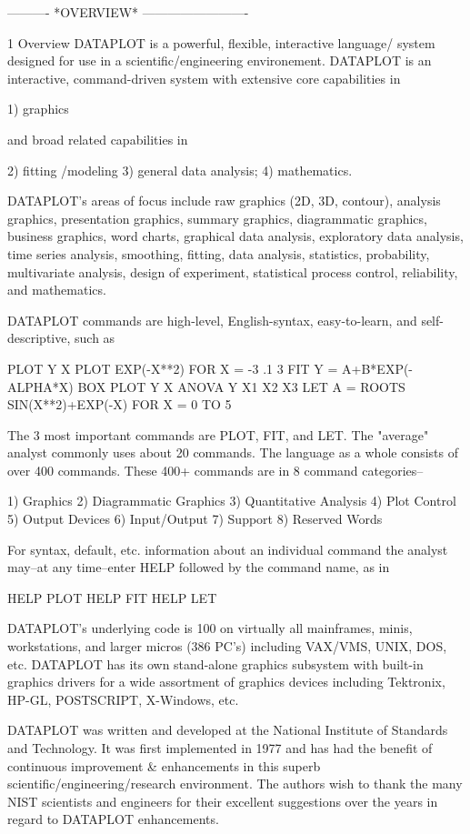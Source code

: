 ----------  *OVERVIEW*  -------------------------
 
1
Overview
DATAPLOT is a powerful, flexible, interactive language/
system designed for use in a scientific/engineering
environement.  DATAPLOT is an interactive, command-driven
system with extensive core capabilities in
 
      1) graphics
 
and broad related capabilities in
 
      2) fitting /modeling
      3) general data analysis;
      4) mathematics.
 
DATAPLOT's areas of focus include raw graphics (2D,
3D, contour), analysis graphics, presentation graphics,
summary graphics, diagrammatic graphics, business graphics,
word charts, graphical data analysis, exploratory data
analysis, time series analysis, smoothing, fitting, data
analysis, statistics, probability, multivariate analysis,
design of experiment, statistical process control,
reliability, and mathematics.
 
DATAPLOT commands are high-level, English-syntax,
easy-to-learn, and self-descriptive, such as
 
      PLOT Y X
      PLOT EXP(-X**2) FOR X = -3 .1 3
      FIT Y = A+B*EXP(-ALPHA*X)
      BOX PLOT Y X
      ANOVA Y X1 X2 X3
      LET A = ROOTS SIN(X**2)+EXP(-X) FOR X = 0 TO 5
 
The 3 most important commands are PLOT, FIT, and LET.
The "average" analyst commonly uses about 20 commands.
The language as a whole consists of over 400 commands.
These 400+ commands are in 8 command categories--
 
   1) Graphics
   2) Diagrammatic Graphics
   3) Quantitative Analysis
   4) Plot Control
   5) Output Devices
   6) Input/Output
   7) Support
   8) Reserved Words
 
For syntax, default, etc.  information about an individual
command the analyst may--at any time--enter HELP
followed by the command name, as in
 
      HELP PLOT
      HELP FIT
      HELP LET
 
DATAPLOT's underlying code is 100%
on virtually all mainframes, minis, workstations, and
larger micros (386 PC's) including VAX/VMS, UNIX, DOS,
etc.  DATAPLOT has its own stand-alone graphics
subsystem with built-in graphics drivers for a wide
assortment of graphics devices including Tektronix,
HP-GL, POSTSCRIPT, X-Windows, etc.
 
DATAPLOT was written and developed at the National Institute
of Standards and Technology.  It was first implemented in
1977 and has had the benefit of continuous improvement &
enhancements in this superb scientific/engineering/research
environment.  The authors wish to thank the many NIST
scientists and engineers for their excellent suggestions
over the years in regard to DATAPLOT enhancements.
 
